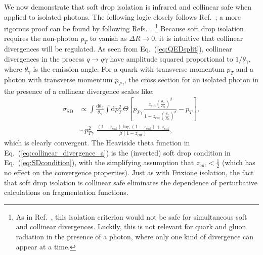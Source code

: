 \documentclass[a4paper,11pt]{article}
\DeclareRobustCommand{\Eq}[1]{Eq.~(\ref{#1})}
\DeclareRobustCommand{\Ref}[1]{Ref.~\cite{#1}}
\DeclareRobustCommand{\Refs}[1]{Refs.~\cite{#1}}
\begin{document}
We now demonstrate that soft drop isolation is infrared and collinear safe when applied to isolated photons.
%
The following logic closely follows \Ref{Frixione:1998jh}; a more rigorous proof can be found by following \Refs{Catani:1998yh,Catani:2002ny}.%
%
\footnote{As in \Ref{Frixione:1998jh}, this isolation criterion would not be safe for simultaneous soft and collinear divergences.  Luckily, this is not relevant for quark and gluon radiation in the presence of a photon, where only one kind of divergence can appear at a time.}
%
Because soft drop isolation requires the non-photon $p_T$ to vanish as $\Delta R \rightarrow 0$, it is intuitive that collinear divergences will be regulated. 
%
As seen from \Eq{eq:QEDsplit}, collinear divergences in the process $q \to q \gamma$ have amplitude squared proportional to $1/\theta_\gamma$, where $\theta_\gamma$ is the emission angle.
%
For a quark with transverse momentum $p_T$ and a photon with transverse momentum $p_{T\gamma}$, the cross section for an isolated photon in the presence of a collinear divergence scales like:
%
\begin{subequations}
\begin{align}
  \label{eq:collinear_divergence_a}
    \sigma_{\text{SD}}
    & \propto \int \frac{\text{d} \theta_\gamma}{\theta_\gamma} \int \text{d}p^2_T \, \Theta\left[p_{T\gamma}\, \frac{z_{\text{cut}} \left(\frac{\theta_\gamma}{R_0}\right)^{\beta}}{1 - z_{\text{cut}} \left(\frac{\theta_\gamma}{R_0}\right)^{\beta}} - p_T\right], \\[10pt]
    & \sim p_{T\gamma}^2 \,\, \frac{(1 - z_{\text{cut}}) \log (1-z_{\text{cut}})+ z_{\text{cut}}}{\beta (1 - z_{\text{cut}})},
\end{align}
\label{eq:collinear_divergence}%
\end{subequations}
%
which is clearly convergent.
%
The Heaviside theta function in \Eq{eq:collinear_divergence_a} is the (inverted) soft drop condition in \Eq{eq:SDcondition}, with the simplifying assumption that $z_{\text{cut}} < \frac{1}{2}$ (which has no effect on the convergence properties).
%
Just as with Frixione isolation, the fact that soft drop isolation is collinear safe eliminates the dependence of perturbative calculations on fragmentation functions.
\end{document}
